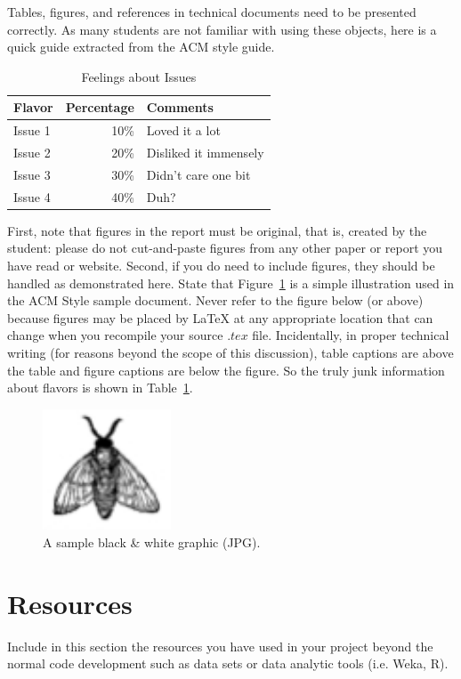 \documentclass[12pt]{article}
\begin{document}
    Tables, figures, and references in technical
    documents need to be presented correctly. As many students
    are not familiar with using these objects, here is a quick
    guide extracted from the ACM style guide.

    \begin{table}
        \centering
        \caption{Feelings about Issues}
        \label{SAMPLE TABLE}
        \begin{tabular}{|l|r|l|} \hline
        Flavor&Percentage&Comments\\ \hline
        Issue 1 &  10\% & Loved it a lot\\ \hline
        Issue 2 &  20\% & Disliked it immensely\\ \hline
        Issue 3 &  30\% & Didn't care one bit\\ \hline
        Issue 4 &  40\% & Duh?\\ \hline
        \end{tabular}
    \end{table}


    First, note that figures in the report must be original, that is,
    created by the student: please do not cut-and-paste figures from any
    other paper or report you have read or website. Second, if you do need to include figures,
    they should be handled as demonstrated here. State that
    Figure~\ref{SAMPLE FIGURE} is a simple illustration used in the ACM
    Style sample document. Never refer to the figure below (or above)
    because figures may be placed by \LaTeX{} at any appropriate location
    that can change when you recompile your source $.tex$
    file. Incidentally, in proper technical writing (for reasons beyond
    the scope of this discussion), table captions are above the table and
    figure captions are below the figure. So the truly junk information
    about flavors is shown in Table~\ref{SAMPLE TABLE}.

    \begin{figure}[htb]
        \begin{center}

            \includegraphics[width=1.5in]{fly.jpg}
            \caption{A sample black \& white graphic (JPG).}
            \label{SAMPLE FIGURE}
        \end{center}
    \end{figure}

    \section{Resources}
    Include in this section the resources you have used in your project beyond the normal code development such as data sets or data analytic tools (i.e. Weka, R).
\end{document}

